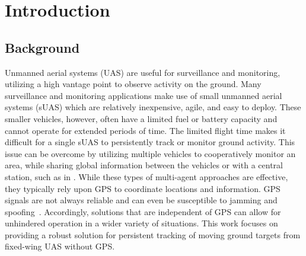\chapter{Introduction}
\label{ch:introduction}

%

\section{Background}
Unmanned aerial systems (UAS) are useful for surveillance and monitoring, utilizing a high vantage point to observe activity on the ground.
Many surveillance and monitoring applications make use of small unmanned aerial systems (sUAS) which are relatively inexpensive, agile, and easy to deploy.
These smaller vehicles, however, often have a limited fuel or battery capacity and cannot operate for extended periods of time.
The limited flight time makes it difficult for a single sUAS to persistently track or monitor ground activity.
This issue can be overcome by utilizing multiple vehicles to cooperatively monitor an area, while sharing global information between the vehicles or with a central station, such as in \cite{WatsonCoutoSussman18,ValentiDaleHowFariasVian12}.
While these types of multi-agent approaches are effective, they typically rely upon GPS to coordinate locations and information.
GPS signals are not always reliable and can even be susceptible to jamming and spoofing~\cite{KernsShepardBhattiHumphreys2014}.
Accordingly, solutions that are independent of GPS can allow for unhindered operation in a wider variety of situations.
This work focuses on providing a robust solution for persistent tracking of moving ground targets from fixed-wing UAS without GPS.

